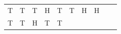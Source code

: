 {\begin{center}
\begin{xtabular*}{\mytablewidth}[t]{|p{10\mystarwidth}|p{10\mystarwidth}|p{10\mystarwidth}|p{10\mystarwidth}|p{10\mystarwidth}|p{10\mystarwidth}|p{10\mystarwidth}|p{10\mystarwidth}|p{10\mystarwidth}|p{10\mystarwidth}|}
        T &
        T &
        T &
        H &
        T &
        T &
        H &
        H%
     \tabularnewline{}
        T &
        T &
        H &
        T &
        T &

\end{xtabular*}
\end{center}}
